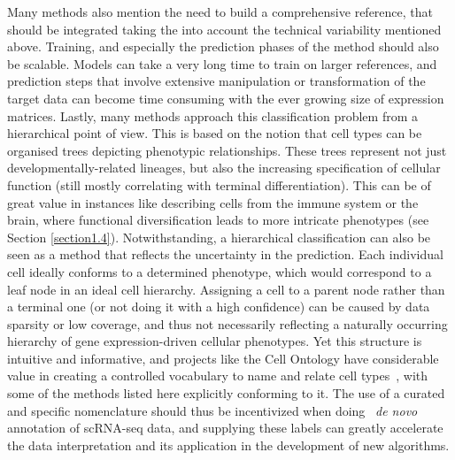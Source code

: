 Many methods also mention the need to build a comprehensive reference, that should be integrated taking the into account the technical variability mentioned above. Training, and especially the prediction phases of the method should also be scalable. Models can take a very long time to train on larger references, and prediction steps that involve extensive manipulation or transformation of the target data can become time consuming with the ever growing size of expression matrices. 
Lastly, many methods approach this classification problem from a hierarchical point of view. This is based on the notion that cell types can be organised trees depicting phenotypic relationships. These trees represent not just developmentally-related lineages, but also the increasing specification of cellular function (still mostly correlating with terminal differentiation). This can be of great value in instances like describing cells from the immune system or the brain, where functional diversification leads to more intricate phenotypes (see Section \ref{section1.4}). Notwithstanding, a hierarchical classification can also be seen as a method that reflects the uncertainty in the prediction. Each individual cell ideally conforms to a determined phenotype, which would correspond to a leaf node in an ideal cell hierarchy. Assigning a cell to a parent node rather than a terminal one (or not doing it with a high confidence) can be caused by data sparsity or low coverage, and thus not necessarily reflecting a naturally occurring hierarchy of gene expression-driven cellular phenotypes. Yet this structure is intuitive and informative, and projects like the Cell Ontology have considerable value in creating a controlled vocabulary to name and relate cell types~\citep{bard_ontology_2005}, with some of the methods listed here explicitly conforming to it. The use of a curated and specific nomenclature should thus be incentivized when doing ~\textit{de novo} annotation of scRNA-seq data, and supplying these labels can greatly accelerate the data interpretation and its application in the development of new algorithms.

